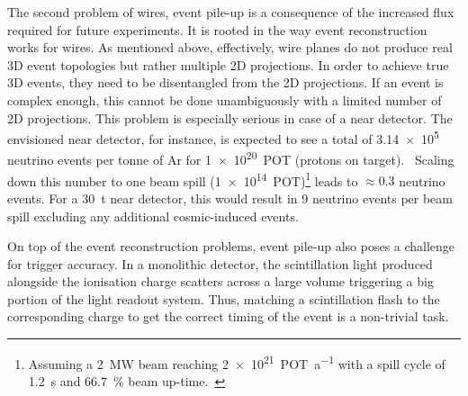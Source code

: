 The second problem of wires, event pile-up is a consequence of the increased flux required for future experiments.
It is rooted in the way event reconstruction works for wires.
As mentioned above, effectively, wire planes do not produce real 3D event topologies but rather multiple 2D projections.
In order to achieve true 3D events, they need to be disentangled from the 2D projections.
If an event is complex enough, this cannot be done unambiguously with a limited number of 2D projections.
This problem is especially serious in case of a near detector.
The envisioned \dune{} near detector, for instance, is expected to see a total of \num{3.14e5} neutrino events per tonne of Ar for \SI{1e20}{POT} (protons on target).~\cite{dune2}
Scaling down this number to one beam spill (\SI{1e14}{POT})\footnote{Assuming a \SI{2}{\mega\watt} beam reaching \SI{2e21}{POT\per a} with a spill cycle of \SI{1.2}{\second} and \SI{66.7}{\percent} beam up-time.~\cite{dune2, dune4}} leads to $\approx \num{0.3}$ neutrino events.
For a \SI{30}{\tonne} near detector, this would result in \num{9} neutrino events per beam spill excluding any additional cosmic-induced events.

On top of the event reconstruction problems, event pile-up also poses a challenge for trigger accuracy.
In a monolithic detector, the scintillation light produced alongside the ionisation charge scatters across a large volume triggering a big portion of the light readout system.
Thus, matching a scintillation flash to the corresponding charge to get the correct timing of the event is a non-trivial task.